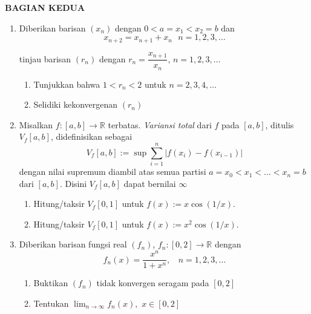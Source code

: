 \documentclass[12pt,twoside]{article}
\begin{document}
\newpage
\newpage \textbf
{BAGIAN KEDUA}
\begin{enumerate}
	\item Diberikan barisan $(x_n)$ dengan $0<a=x_1<x_2=b$ dan $$x_{n+2}=x_{
				      n+1}+x_n~~~n=1,2,3,\dots$$

	      tinjau barisan $(r_n)$ dengan $r_n=\dfrac{x_{n+1}}{x_n}$, $n=1,2,3,\dots$
	      \begin{enumerate}
		      \item[(a)] Tunjukkan bahwa $1<r_n<2$ untuk $n=2,3,4,\dots$
		      \item [(b)] Selidiki kekonvergenan $(r_n)$
	      \end{enumerate}

	\item Misalkan $f:[a,b]\to \mathbb{R}$ terbatas. \textit{Variansi total} dari $f$ pada $[a,b]$, ditulis $V_f[a,b]$, didefinisikan sebagai $$V_f[a,b]:=\sup\sum_{i=1}^{n}|f(x_i)-f(x_{i-1})|$$
	      dengan nilai supremum diambil atas semua partisi $a=x_0<x_1<\dots<x_n=b$ dari $[a,b]$. Disini $V_f[a,b]$ dapat bernilai $\infty$
	      \begin{enumerate}
		      \item[(a)] Hitung/taksir $V_f[0,1]$ untuk $f(x):=x\cos(1/x)$.
		      \item[(b)] Hitung/taksir $V_f[0,1]$ untuk $f(x):=x^2\cos(1/x)$.
	      \end{enumerate}
	\item Diberikan barisan fungsi real $(f_n)$, $f_n:[0,2]\to \mathbb{R}$ dengan
	      $$f_n(x)=\dfrac{x^n}{1+x^n},~~~~n=1,2,3,\dots$$
	      \begin{enumerate}
		      \item[(a)] Buktikan $(f_n)$ tidak konvergen seragam pada $[0,2]$
		      \item[(b)] Tentukan $\displaystyle \lim_{n\to \infty}f_n(x),$ $x\in [0,2]$
	      \end{enumerate}
\end{enumerate}
\newpage
\end{document}
